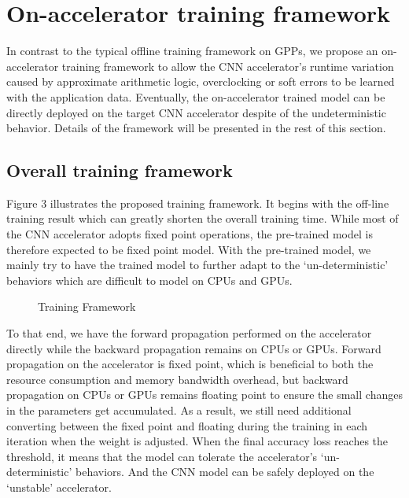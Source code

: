 \section{On-accelerator training framework} \label{sec:framework}
In contrast to the typical offline training framework on GPPs, we propose an 
on-accelerator training framework to allow the CNN accelerator's runtime variation 
caused by approximate arithmetic logic, overclocking or soft errors 
to be learned with the application data. Eventually, the on-accelerator 
trained model can be directly deployed on the target CNN accelerator despite of 
the undeterministic behavior. Details of the framework will be presented in 
the rest of this section.

\subsection{Overall training framework}
Figure 3 illustrates the proposed training framework. It begins with the 
off-line training result which can greatly shorten the overall training time. 
While most of the CNN accelerator adopts fixed point operations, the pre-trained model 
is therefore expected to be fixed point model. With the pre-trained model, 
we mainly try to have the trained model to further adapt to the ‘un-deterministic’ 
behaviors which are difficult to model on CPUs and GPUs.

\begin{figure*}
        \caption{Training Framework}
        \label{fig:retrain}
\end{figure*}


  To that end, we have the forward propagation performed on the accelerator 
directly while the backward propagation remains on CPUs or GPUs. Forward propagation 
on the accelerator is fixed point, which is beneficial to both the resource consumption 
and memory bandwidth overhead, but backward propagation on CPUs or GPUs remains floating 
point to ensure the small changes in the parameters get accumulated\cite{Matthieu2014_8}. As a result, 
we still need additional converting between the fixed point and floating during 
the training in each iteration when the weight is adjusted. When the final accuracy 
loss reaches the threshold, it means that the model can tolerate 
the accelerator’s ‘un-deterministic’ behaviors. And the CNN model can be safely 
deployed on the ‘unstable’ accelerator. 

